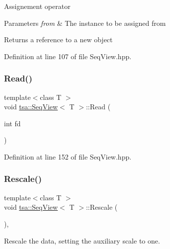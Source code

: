Assignement operator


\begin{DoxyParams}{Parameters}
{\em from} & The instance to be assigned from\\
\hline
\end{DoxyParams}
\begin{DoxyReturn}{Returns}
a reference to a new object 
\end{DoxyReturn}


Definition at line 107 of file Seq\+View.\+hpp.

\mbox{\label{classtsa_1_1_seq_view_a9fad44013de1bc3898d0ba8dc0f21481}} 
\subsubsection{\texorpdfstring{Read()}{Read()}}
{\footnotesize\ttfamily template$<$class T $>$ \\
void \hyperlink{classtsa_1_1_seq_view}{tsa\+::\+Seq\+View}$<$ T $>$\+::Read (\begin{DoxyParamCaption}\item[{int}]{fd }\end{DoxyParamCaption})\hspace{0.3cm}{\ttfamily [inline]}}



Definition at line 152 of file Seq\+View.\+hpp.

\mbox{\label{classtsa_1_1_seq_view_a400883f9563926797fdfe3e0fd89faa9}} 
\subsubsection{\texorpdfstring{Rescale()}{Rescale()}}
{\footnotesize\ttfamily template$<$class T $>$ \\
void \hyperlink{classtsa_1_1_seq_view}{tsa\+::\+Seq\+View}$<$ T $>$\+::Rescale (\begin{DoxyParamCaption}{ }\end{DoxyParamCaption})\hspace{0.3cm}{\ttfamily [inline]}, {\ttfamily [protected]}}

Rescale the data, setting the auxiliary scale to one. 


